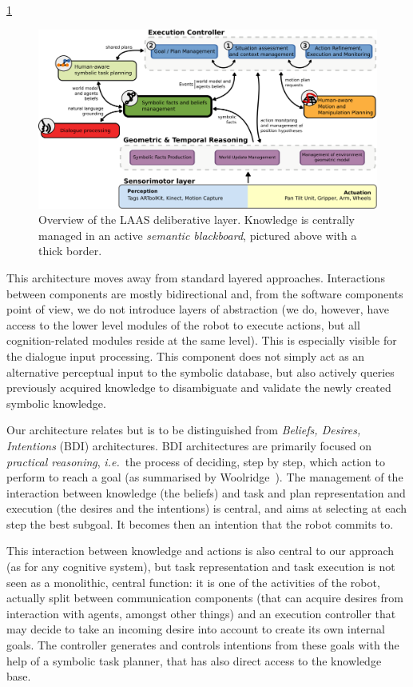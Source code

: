 \documentclass[letterpaper, 10 pt, conference]{ieeeconf}  %
\newcommand{\ie}{{\textit{i.e.\ }}}
\begin{document}
\cite{Alami2011}
\ref{fig|archi}

\begin{figure}
        \centering
        \includegraphics[width=1.7\columnwidth]{archi}
        \caption{Overview of the LAAS deliberative layer. Knowledge is
        centrally managed in an active \emph{semantic blackboard}, pictured
        above with a thick border.}
        \label{fig|archi}
\end{figure}


This architecture moves away from standard layered approaches. Interactions
between components are mostly bidirectional and, from the software components
point of view, we do not introduce layers of abstraction (we do, however, have
access to the lower level modules of the robot to execute actions, but all
cognition-related modules reside at the same level). This is especially visible
for the dialogue input processing. This component does not simply act as an
alternative perceptual input to the symbolic database, but also actively
queries previously acquired knowledge to disambiguate and validate the newly
created symbolic knowledge.

Our architecture relates but is to be distinguished from \emph{Beliefs,
Desires, Intentions} (BDI) architectures. BDI architectures are primarily
focused on \emph{practical reasoning}, \ie the process of deciding, step by
step, which action to perform to reach a goal (as summarised by
Woolridge~\cite{Woolridge1999}). The management of the interaction between
knowledge (the beliefs) and task and plan representation and execution (the
desires and the intentions) is central, and aims at selecting at each step the
best subgoal. It becomes then an intention that the robot commits to.

This interaction between knowledge and actions is also central to our approach
(as for any cognitive system), but task representation and task execution is
not seen as a monolithic, central function: it is one of the activities of the
robot, actually split between communication components (that can acquire
desires from interaction with agents, amongst other things) and an execution
controller that may decide to take an incoming desire into account to create
its own internal goals. The controller generates and controls intentions from
these goals with the help of a symbolic task planner, that has also direct
access to the knowledge base.
\end{document}
